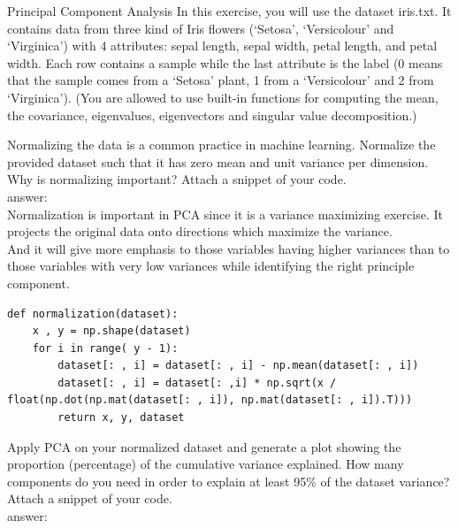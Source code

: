 \documentclass[
	ngerman,
     solution=true
	]{tudaexercise}
\begin{document}
\begin{task}{Principal Component Analysis}
In this exercise, you will use the dataset iris.txt. It contains data from three kind of Iris flowers (‘Setosa’, ‘Versicolour’
and ‘Virginica’) with 4 attributes: sepal length, sepal width, petal length, and petal width. Each row contains a sample
while the last attribute is the label (0 means that the sample comes from a ‘Setosa’ plant, 1 from a ‘Versicolour’ and
2 from ‘Virginica’). (You are allowed to use built-in functions for computing the mean, the covariance, eigenvalues,
eigenvectors and singular value decomposition.)
\begin{subtask}[3a)]
Normalizing the data is a common practice in machine learning. Normalize the provided dataset such that it has zero
mean and unit variance per dimension. Why is normalizing important? Attach a snippet of your code.\\[15pt]
answer:\\[15pt]
Normalization is important in PCA since it is a variance maximizing exercise. It projects the original data onto directions which maximize the variance.\\
And it will give more emphasis to those variables having higher variances than to those variables with very low variances while identifying the right principle component.
\begin{lstlisting}
def normalization(dataset):
    x , y = np.shape(dataset)
    for i in range( y - 1):
        dataset[: , i] = dataset[: , i] - np.mean(dataset[: , i])
        dataset[: , i] = dataset[: ,i] * np.sqrt(x / float(np.dot(np.mat(dataset[: , i]), np.mat(dataset[: , i]).T)))
        return x, y, dataset
\end{lstlisting}
\end{subtask}
\begin{subtask}[3b)]
Apply PCA on your normalized dataset and generate a plot showing the proportion (percentage) of the cumulative
variance explained. How many components do you need in order to explain at least 95\% of the dataset variance?
Attach a snippet of your code.\\[15pt]
answer:\\[15pt]
\begin{lstlisting}


\end{lstlisting}
\end{subtask}
\end{task}
\end{document}
